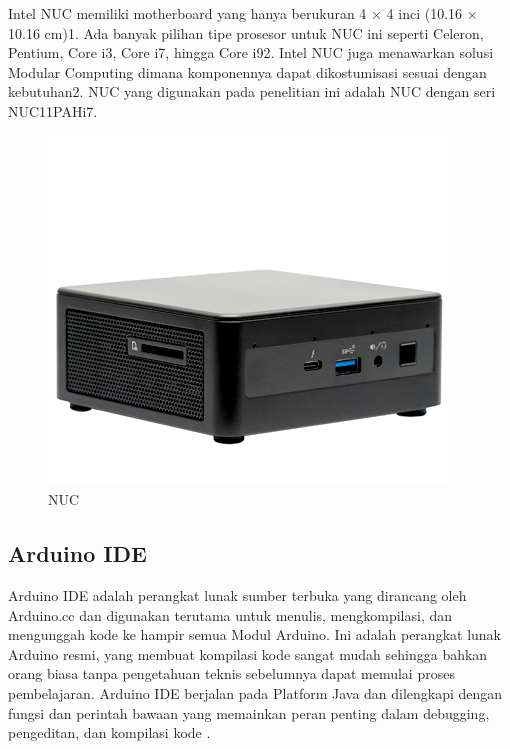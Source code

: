 Intel NUC memiliki motherboard yang hanya berukuran 4 × 4 inci (10.16 × 10.16 cm)1. Ada banyak pilihan tipe prosesor untuk NUC ini seperti Celeron, Pentium, Core i3, Core i7, hingga Core i92. Intel NUC juga menawarkan solusi Modular Computing dimana komponennya dapat dikostumisasi sesuai dengan kebutuhan2. NUC yang digunakan pada penelitian ini adalah NUC dengan seri NUC11PAHi7. 
\begin{figure} [H] \centering
    \includegraphics[scale=0.4]{gambar/nuc.png}
    \caption{NUC}
    \label{fig:Proses Flattening}
\end{figure}


\subsection{Arduino IDE}
Arduino IDE adalah perangkat lunak sumber terbuka yang dirancang oleh Arduino.cc dan digunakan terutama untuk menulis, mengkompilasi, dan mengunggah kode ke hampir semua Modul Arduino. Ini adalah perangkat lunak Arduino resmi, yang membuat kompilasi kode sangat mudah sehingga bahkan orang biasa tanpa pengetahuan teknis sebelumnya dapat memulai proses pembelajaran. Arduino IDE berjalan pada Platform Java dan dilengkapi dengan fungsi dan perintah bawaan yang memainkan peran penting dalam debugging, pengeditan, dan kompilasi kode \parencite{Watson_2023}.

